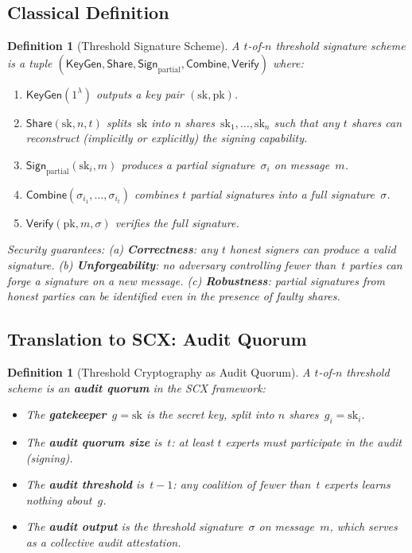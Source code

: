 \documentclass[12pt,a4paper]{article}
\newtheorem{definition}[theorem]{Definition}
\theoremstyle{remark}
\newcommand{\SCX}{\textsf{SCX}}
\newcommand{\Verify}{\textsf{Verify}}
\newcommand{\KeyGen}{\textsf{KeyGen}}
\newcommand{\Sign}{\textsf{Sign}}
\newcommand{\Combine}{\textsf{Combine}}
\newcommand{\Share}{\textsf{Share}}
\begin{document}
\subsection{Classical Definition}

\begin{definition}[Threshold Signature Scheme]
\label{def:threshold_sig}
A $t$-of-$n$ threshold signature scheme is a tuple $(\KeyGen, \Share, \Sign_{\text{partial}}, \Combine, \Verify)$ where:
\begin{enumerate}[leftmargin=*, label=(\roman*)]
  \item $\KeyGen(1^\lambda)$ outputs a key pair $(\text{sk}, \text{pk})$.
  \item $\Share(\text{sk}, n, t)$ splits~$\text{sk}$ into $n$ shares~$\text{sk}_1, \ldots, \text{sk}_n$ such that any $t$ shares can reconstruct (implicitly or explicitly) the signing capability.
  \item $\Sign_{\text{partial}}(\text{sk}_i, m)$ produces a partial signature~$\sigma_i$ on message~$m$.
  \item $\Combine(\sigma_{i_1}, \ldots, \sigma_{i_t})$ combines $t$ partial signatures into a full signature~$\sigma$.
  \item $\Verify(\text{pk}, m, \sigma)$ verifies the full signature.
\end{enumerate}
Security guarantees: (a) \textbf{Correctness}: any $t$ honest signers can produce a valid signature. (b) \textbf{Unforgeability}: no adversary controlling fewer than~$t$ parties can forge a signature on a new message. (c) \textbf{Robustness}: partial signatures from honest parties can be identified even in the presence of faulty shares.
\end{definition}

\subsection{Translation to SCX: Audit Quorum}

\begin{definition}[Threshold Cryptography as Audit Quorum]
\label{def:threshold_audit}
A $t$-of-$n$ threshold scheme is an \textbf{audit quorum} in the \SCX{} framework:
\begin{itemize}[leftmargin=*]
  \item The \textbf{gatekeeper}~$g = \text{sk}$ is the secret key, split into $n$ shares~$g_i = \text{sk}_i$.
  \item The \textbf{audit quorum size} is~$t$: at least $t$ experts must participate in the audit (signing).
  \item The \textbf{audit threshold} is~$t-1$: any coalition of fewer than~$t$ experts learns nothing about~$g$.
  \item The \textbf{audit output} is the threshold signature~$\sigma$ on message~$m$, which serves as a collective audit attestation.
\end{itemize}
\end{definition}
\end{document}
